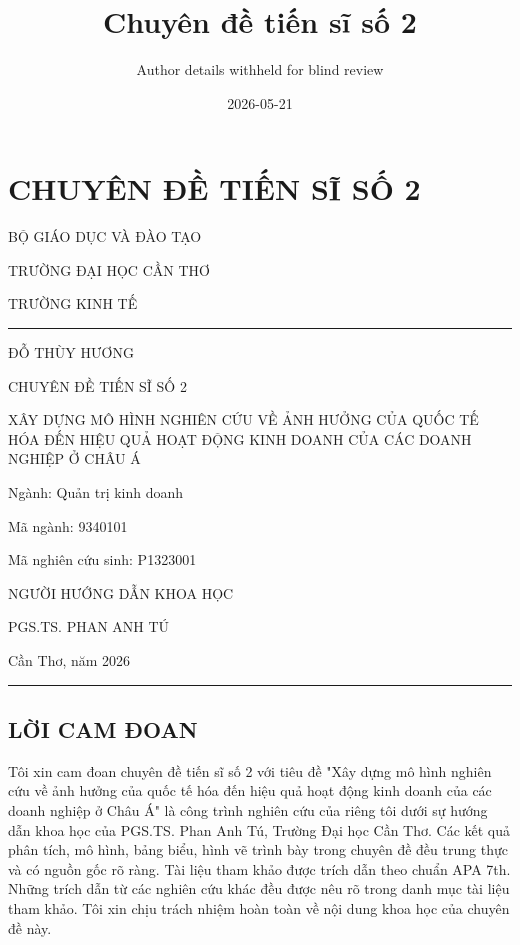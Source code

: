 \documentclass[12pt,a4paper]{article}
\title{Chuyên đề tiến sĩ số 2}
\author{Author details withheld for blind review}
\date{2026-05-21}
\begin{document}
\maketitle

\hypertarget{chuyuxean-ux111ux1ec1-tiux1ebfn-sux129-sux1ed1-2}{%
\section{CHUYÊN ĐỀ TIẾN SĨ SỐ
2}\label{chuyuxean-ux111ux1ec1-tiux1ebfn-sux129-sux1ed1-2}}

BỘ GIÁO DỤC VÀ ĐÀO TẠO

TRƯỜNG ĐẠI HỌC CẦN THƠ

TRƯỜNG KINH TẾ

\begin{center}\rule{0.5\linewidth}{0.5pt}\end{center}

ĐỖ THÙY HƯƠNG

CHUYÊN ĐỀ TIẾN SĨ SỐ 2

XÂY DỰNG MÔ HÌNH NGHIÊN CỨU VỀ ẢNH HƯỞNG CỦA QUỐC TẾ HÓA ĐẾN HIỆU QUẢ
HOẠT ĐỘNG KINH DOANH CỦA CÁC DOANH NGHIỆP Ở CHÂU Á

Ngành: Quản trị kinh doanh

Mã ngành: 9340101

Mã nghiên cứu sinh: P1323001

NGƯỜI HƯỚNG DẪN KHOA HỌC

PGS.TS. PHAN ANH TÚ

Cần Thơ, năm 2026

\begin{center}\rule{0.5\linewidth}{0.5pt}\end{center}

\hypertarget{lux1eddi-cam-ux111oan}{%
\subsection{LỜI CAM ĐOAN}\label{lux1eddi-cam-ux111oan}}

Tôi xin cam đoan chuyên đề tiến sĩ số 2 với tiêu đề "Xây dựng mô hình
nghiên cứu về ảnh hưởng của quốc tế hóa đến hiệu quả hoạt động kinh
doanh của các doanh nghiệp ở Châu Á" là công trình nghiên cứu của riêng
tôi dưới sự hướng dẫn khoa học của PGS.TS. Phan Anh Tú, Trường Đại học
Cần Thơ. Các kết quả phân tích, mô hình, bảng biểu, hình vẽ trình bày
trong chuyên đề đều trung thực và có nguồn gốc rõ ràng. Tài liệu tham
khảo được trích dẫn theo chuẩn APA 7th. Những trích dẫn từ các nghiên
cứu khác đều được nêu rõ trong danh mục tài liệu tham khảo. Tôi xin chịu
trách nhiệm hoàn toàn về nội dung khoa học của chuyên đề này.
\end{document}
